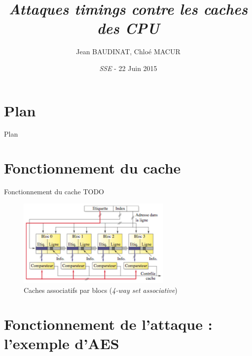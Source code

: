 \documentclass[11pt]{beamer}
\begin{document}
\title[Attaques timings contre les caches des CPU]{\textit{Attaques timings contre les caches des CPU} }

\author[Jean BAUDINAT, Chloé MACUR]{Jean BAUDINAT, Chloé MACUR}

\date[\thedate]{\footnotesize{\textsl{SSE} - 22 Juin 2015}}

\begin{frame}
  \titlepage
\end{frame}

\section*{Plan}
\addtocounter{section}{-1}
\begin{frame}{Plan} 
  \tableofcontents%
\end{frame}




\section[Fonctionnement du cache]{Fonctionnement du cache}

\begin{frame}{Fonctionnement du cache}
TODO
\begin{figure}[h]
  \centering
  \includegraphics[width=7.5cm]{figures/cache_associative.png}
  \caption{Caches associatifs par blocs (\emph{4-way set associative})}
  \label{cache} 
\end{figure}
\end{frame}

\section{Fonctionnement de l'attaque : l'exemple d'AES}
\end{document}
